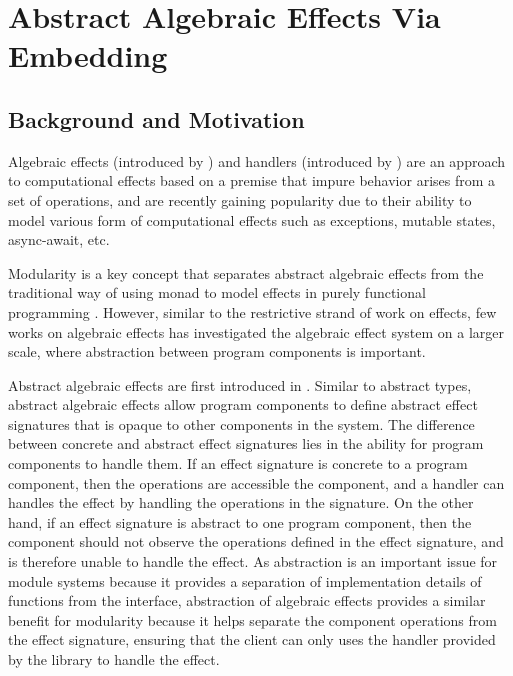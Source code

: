 
\chapter{Abstract Algebraic Effects Via Embedding}
\label{chapter-algebraic}

\section{Background and Motivation}
\label{sec-motivation}

Algebraic effects (introduced by \citet{plotkin02}) and handlers (introduced by \citet{plotkin09}) are an approach to computational effects based on a premise that impure behavior arises from a set of operations, and are recently gaining popularity due to their ability to model various form of computational effects such as exceptions, mutable states, async-await, etc.

Modularity is a key concept that separates abstract algebraic effects from the traditional way of using monad to model effects in purely functional programming \cite{schrijvers19}. However, similar to the restrictive strand of work on effects, few works on algebraic effects has investigated the algebraic effect system on a larger scale, where abstraction between program components is important. 

Abstract algebraic effects are first introduced in \citet{biernacki19}. Similar to abstract types, abstract algebraic effects allow program components to define abstract effect signatures that is opaque to other components in the system. The difference between concrete and abstract effect signatures lies in the ability for program components to handle them. If an effect signature is concrete to a program component, then the operations are accessible the component, and a handler can handles the effect by handling the operations in the signature. On the other hand, if an effect signature is abstract to one program component, then the component should not observe the operations defined in the effect signature, and is therefore unable to handle the effect. As abstraction is an important issue for module systems because it provides a separation of implementation details of functions from the interface, abstraction of algebraic effects provides a similar benefit for modularity because it helps separate the component operations from the effect signature, ensuring that the client can only uses the handler provided by the library to handle the effect.

